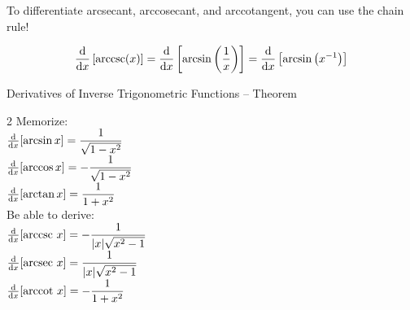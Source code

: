 \begin{frame}[t]
\begin{QuestionSet}
{}

\end{QuestionSet}
\end{frame}

\begin{frame}[t]
To differentiate arcsecant, arccosecant, and arccotangent, you can use the chain rule!\pause

\color{answercolor}
\[\frac{\text{d}}{\text{d}x}\left[ \text{arccsc}(x)\right]=\frac{\text{d}}{\text{d}x}\left[\arcsin\left(\frac{1}{x}\right)\right]=\frac{\text{d}}{\text{d}x}\left[\arcsin\left(x^{-1}\right)\right]\]\pause


\end{frame}

\begin{frame}
\begin{block}{Derivatives of Inverse Trigonometric Functions -- Theorem~}
\begin{multicols}{2}
\color{answercolor}
Memorize:\\[1em]
$\frac{\text{d}}{\text{d}x}[\arcsin x] = \dfrac{1}{\sqrt{ 1-x^2}}$\\
$\frac{\text{d}}{\text{d}x}[\arccos x] = -\dfrac{1}{\sqrt{ 1-x^2}}$\\
$\frac{\text{d}}{\text{d}x}[\arctan x] = \dfrac{1}{ 1+x^2}$\\
\columnbreak 
\color{black}
Be able to derive:\\[1em]
$\frac{\text{d}}{\text{d}x}[\text{arccsc}~ x]=-\dfrac{1}{|x|\sqrt{x^2-1}}$\\
$\frac{\text{d}}{\text{d}x}[\text{arcsec}~ x]=\dfrac{1}{|x|\sqrt{x^2-1}}$\\
$\frac{\text{d}}{\text{d}x}[\text{arccot}~ x]=-\dfrac{1}{1+x^2}$\\ $ $
\end{multicols}
\end{block}

\end{frame}

